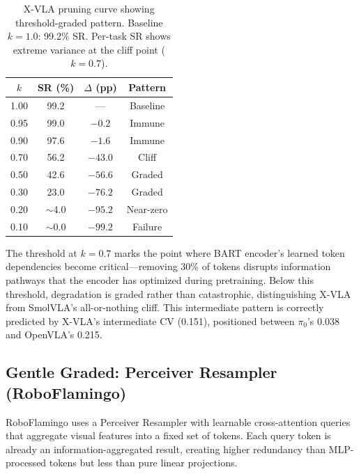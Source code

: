 \documentclass[letterpaper]{article}
\begin{document}
\begin{table}[h]
\centering
\caption{X-VLA pruning curve showing threshold-graded pattern. Baseline $k{=}1.0$: 99.2\% SR. Per-task SR shows extreme variance at the cliff point ($k{=}0.7$).}
\label{tab:xvla_curve}
\small
\begin{tabular}{cccc}
\toprule
$k$ & \textbf{SR (\%)} & $\Delta$ \textbf{(pp)} & \textbf{Pattern} \\
\midrule
1.00 & 99.2 & --- & \textcolor{immune}{Baseline} \\
0.95 & 99.0 & $-0.2$ & \textcolor{immune}{Immune} \\
0.90 & 97.6 & $-1.6$ & \textcolor{immune}{Immune} \\
0.70 & 56.2 & $-43.0$ & \textcolor{catastrophic}{Cliff} \\
0.50 & 42.6 & $-56.6$ & \textcolor{graded}{Graded} \\
0.30 & 23.0 & $-76.2$ & \textcolor{graded}{Graded} \\
0.20 & $\sim$4.0 & $-95.2$ & \textcolor{graded}{Near-zero} \\
0.10 & $\sim$0.0 & $-99.2$ & \textcolor{catastrophic}{Failure} \\
\bottomrule
\end{tabular}
\end{table}

The threshold at $k=0.7$ marks the point where BART encoder's learned token dependencies become critical---removing 30\% of tokens disrupts information pathways that the encoder has optimized during pretraining. Below this threshold, degradation is graded rather than catastrophic, distinguishing X-VLA from SmolVLA's all-or-nothing cliff. This intermediate pattern is correctly predicted by X-VLA's intermediate CV (0.151), positioned between $\pi_0$'s 0.038 and OpenVLA's 0.215.

\subsection{Gentle Graded: Perceiver Resampler (RoboFlamingo)}

RoboFlamingo uses a Perceiver Resampler with learnable cross-attention queries that aggregate visual features into a fixed set of tokens. Each query token is already an information-aggregated result, creating higher redundancy than MLP-processed tokens but less than pure linear projections.
\end{document}
